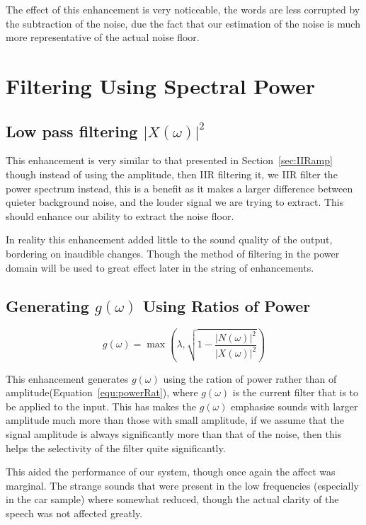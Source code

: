 \documentclass[11pt]{article} %
\begin{document}
The effect of this enhancement is very noticeable, the words are less corrupted by the subtraction of the noise, due the fact that our estimation of the noise is much more representative of the actual noise floor.   
\section{Filtering Using Spectral Power} 
\subsection{Low pass filtering $\lvert X(\omega) \rvert^{2} $} 

This enhancement is very similar to that presented in Section~\ref{sec:IIRamp} though instead of using the amplitude, then IIR filtering it, we IIR filter the power spectrum instead, this is a benefit as it makes a larger difference between quieter background noise, and the louder signal we are trying to extract. This should enhance our ability to extract the noise floor. 

In reality this enhancement added little to the sound quality of the output, bordering on inaudible changes. Though the method of filtering in the power domain will be used to great effect later in the string of enhancements.  

\subsection{Generating $g(\omega)$ Using Ratios of Power} 

\begin{equation}
\label{equ:powerRat}
	g(\omega) = \max\left(\lambda, \sqrt{1- \frac{\lvert N(\omega) \rvert ^{2}}{\lvert X(\omega) \rvert ^{2}}}\right)
\end{equation}

This enhancement generates $g(\omega)$ using the ration of power rather than of amplitude(Equation~\ref{equ:powerRat}), where $g(\omega)$ is the current filter that is to be applied to the input. This has makes the $g(\omega)$ emphasise sounds with larger amplitude much more than those with small amplitude, if we assume that the signal amplitude is always significantly more than that of the noise, then this helps the selectivity of the filter quite significantly. 

This aided the performance of our system, though once again the affect was marginal. The strange sounds that were present in the low frequencies (especially in the car sample) where somewhat reduced, though the actual clarity of the speech was not affected greatly.
\end{document}
